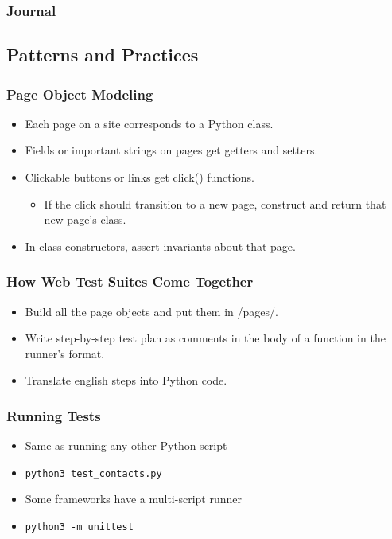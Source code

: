\begin{frame}
  \frametitle{Journal}
\end{frame}

\subsection{Patterns and Practices}

\begin{frame}
  \frametitle{Page Object Modeling}
  \begin{itemize}
    \item Each page on a site corresponds to a Python class.
    \item Fields or important strings on pages get getters and setters.
    \item Clickable buttons or links get click() functions.
    \begin{itemize}
      \item If the click should transition to a new page, construct and return that new page's class.
    \end{itemize}
    \item In class constructors, assert invariants about that page.
  \end{itemize}
\end{frame}

\begin{frame}
  \frametitle{How Web Test Suites Come Together}
  \begin{itemize}
    \item Build all the page objects and put them in /pages/.
    \item Write step-by-step test plan as comments in the body of a function in the runner's format.
    \item Translate english steps into Python code.
  \end{itemize}
\end{frame}

\begin{frame}
  \frametitle{Running Tests}
  \begin{itemize}
    \item Same as running any other Python script
    \item \texttt{python3 test\_contacts.py}
    \item Some frameworks have a multi-script runner
    \item \texttt{python3 -m unittest}
  \end{itemize}
\end{frame}

